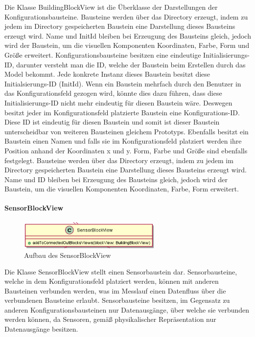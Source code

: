 \documentclass[parskip=full]{scrartcl}
\begin{document}
Die Klasse BuildingBlockView ist die Überklasse der Darstellungen der Konfigurationsbausteine.
Bausteine werden über das Directory erzeugt, indem zu jedem im Directory gespeicherten Baustein eine Darstellung dieses Bausteins erzeugt wird. Name und InitId bleiben bei Erzeugung des Bausteins gleich, jedoch wird der Baustein, um die visuellen Komponenten Koordinaten, Farbe, Form und Größe erweitert.
Konfigurationsbausteine besitzen eine eindeutige Initialisierungs-ID, darunter versteht man die ID, welche der Baustein beim Erstellen durch das Model bekommt. Jede konkrete Instanz dieses Baustein besitzt diese Initialsierungs-ID (InitId). Wenn ein Baustein mehrfach durch den Benutzer in das Konfigurationsfeld gezogen wird, könnte dies dazu führen, dass diese Initialisierungs-ID nicht mehr eindeutig für diesen Baustein wäre. Deswegen besitzt jeder im Konfigurationsfeld platzierte Baustein eine Konfigurations-ID. Diese ID ist eindeutig für diesen Baustein und somit ist dieser Baustein unterscheidbar von weiteren Bausteinen gleichem Prototyps. Ebenfalls besitzt ein Baustein einen Namen und falls sie im Konfigurationsfeld platziert werden ihre Position anhand der Koordinaten x und y. Form, Farbe und Größe sind ebenfalls festgelegt.  
Bausteine werden über das Directory erzeugt, indem zu jedem im Directory gespeicherten Baustein eine Darstellung dieses Bausteins erzeugt wird. Name und ID bleiben bei Erzeugung des Bausteins gleich, jedoch wird der Baustein, um die visuellen Komponenten Koordinaten, Farbe, Form erweitert.

\paragraph{SensorBlockView}

\begin{figure}[htbp]
	\begin{center}
		\includegraphics[width = 7cm]{Grafiken/View/SensorBlockView.png}
		\caption{Aufbau des SensorBlockView}
		\label{Entwurf_Grob}
	\end{center}
\end{figure}

Die Klasse SensorBlockView stellt einen Sensorbaustein dar. 
Sensorbausteine, welche in dem Konfigurationsfeld platziert werden, können mit anderen Bausteinen verbunden werden, was im Messlauf einen Datenfluss über die verbundenen Bausteine erlaubt. Sensorbausteine besitzen, im Gegensatz zu anderen Konfigurationsbausteinen nur Datenausgänge, über welche sie verbunden werden können, da Sensoren, gemäß physikalischer 
Repräsentation nur Datenausgänge besitzen.
\end{document}
